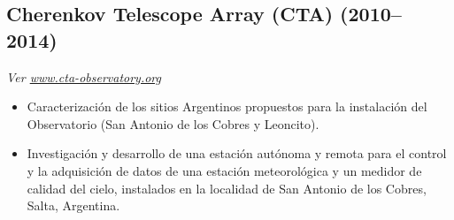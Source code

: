 \subsection*{Cherenkov Telescope Array (CTA) (2010--2014)}
{\small{\textit{Ver \href{http://www.cta-observatory.org}{www.cta-observatory.org}}}}
\begin{itemize}
\item Caracterización de los sitios Argentinos propuestos para la instalación del Observatorio (San Antonio de los Cobres y Leoncito). %
\item Investigación y desarrollo de una estación autónoma y remota para el control y la adquisición de datos de una estación meteorológica y un medidor de calidad del cielo, instalados en la localidad de San Antonio de los Cobres, Salta, Argentina.
\end{itemize}


